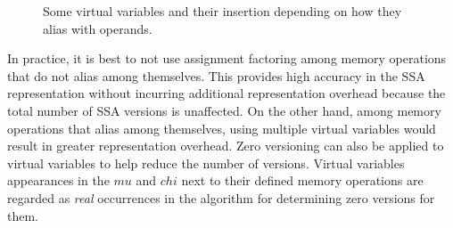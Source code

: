 \begin{figure}
\caption{\label{fig:hssa:virtual_vars}Some virtual variables and their insertion depending on how they alias with operands.}
\end{figure}

In practice, it is best to not use assignment factoring among memory operations that do not alias among themselves.  This provides high accuracy in the SSA
representation without incurring additional representation overhead because the
total number of SSA versions is unaffected.  On the other hand, among memory 
operations that alias among themselves, using multiple virtual variables would
result in greater representation overhead.  Zero versioning can also be applied
to virtual variables to help reduce the number of versions.  Virtual variables
appearances in the $mu$ and $chi$ next to their defined memory operations are
regarded as \emph{real} occurrences in the algorithm for determining zero
versions for them.

